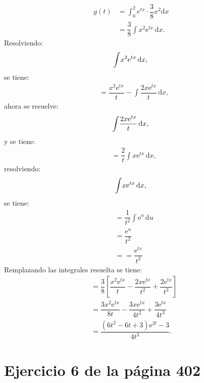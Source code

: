 \documentclass{article}
\begin{document}
\begin{align}
     g(t) &= \displaystyle\int_{0}^2 {e}^{tx}\cdot\dfrac{3}{8}x^{2}{\mathrm{d}x}   \\
        &=  \dfrac{3}{8}{\displaystyle\int}x^2\mathrm{e}^{tx}\,\mathrm{d}x.
\end{align}
   Resolviendo: 
    \begin{equation*}
        {\displaystyle\int}x^2\mathrm{e}^{tx}\,\mathrm{d}x,\\
    \end{equation*}
    se tiene:
        \begin{align}
         &= \dfrac{x^2\mathrm{e}^{tx}}{t}-{\displaystyle\int}\dfrac{2x\mathrm{e}^{tx}}{t}\,\mathrm{d}x,
         \end{align}
          ahora se resuelve: 
    \begin{equation*}
       {\displaystyle\int}\dfrac{2x\mathrm{e}^{tx}}{t}\,\mathrm{d}x,\\
    \end{equation*}  
    y se tiene:
   \begin{align}      
        &= \dfrac{2}{t}{\displaystyle\int}x\mathrm{e}^{tx}\,\mathrm{d}x,
               \end{align}
          resolviendo: 
    \begin{equation*}
       {\displaystyle\int}x\mathrm{e}^{tx}\,\mathrm{d}x,\\
    \end{equation*}  
   se tiene:
   \begin{align} 
         &=\dfrac{1}{t^2}{\displaystyle\int}\mathrm{e}^u\,\mathrm{d}u\\
          &= \dfrac{\mathrm{e}^u}{t^2}\\
          &==\dfrac{\mathrm{e}^{tx}}{t^2}
\end{align}
Remplazando las integrales resuelta se tiene:
 \begin{align}
 &=\dfrac{3}{8}\left[\dfrac{x^2\mathrm{e}^{tx}}{t}-\dfrac{2x\mathrm{e}^{tx}}{t^2}+\dfrac{2\mathrm{e}^{tx}}{t^3}\right]\\
 &= \dfrac{3x^2\mathrm{e}^{tx}}{8t}-\dfrac{3x\mathrm{e}^{tx}}{4t^2}+\dfrac{3\mathrm{e}^{tx}}{4t^3}\\
  &= \dfrac{\left(6t^2-6t+3\right)\mathrm{e}^{2t}-3}{4t^3}.
\end{align}


\section{Ejercicio 6 de la página 402}
\end{document}
